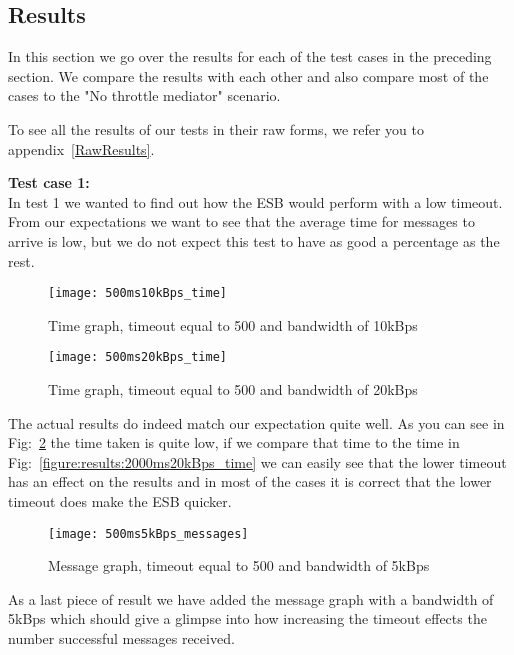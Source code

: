 \subsection{Results}\label{Testing:Results}
	In this section we go over the results for each of the test cases in the preceding section. We compare the results with each other and also compare most of the cases to the "No throttle mediator" scenario.
	
	\begin{shaded}
	To see all the results of our tests in their raw forms, we refer you to \mbox{appendix~\ref{RawResults}}.
	\end{shaded}
	 
    \textbf{Test case 1:}\\
    In test 1 we wanted to find out how the ESB would perform with a low timeout. From our expectations we want to see that the average time for messages to arrive is low, but we do not expect this test to have as good a percentage as the rest. 
    
	\begin{figure}[H]
		\centering
		\texttt{[image: 500ms10kBps\_time]}
		\caption{Time graph, timeout equal to 500 and bandwidth of 10kBps} 
		\label{figure:results:500ms10kBps_time}
	\end{figure}
	
	\begin{figure}[H]
		\centering
		\texttt{[image: 500ms20kBps\_time]}
		\caption{Time graph, timeout equal to 500 and bandwidth of 20kBps} 
		\label{figure:results:500ms20kBps_time}
	\end{figure}
    
    The actual results do indeed match our expectation quite well. As you can see in Fig:~\ref{figure:results:500ms20kBps_time} the time taken is quite low, if we compare that time to the time in Fig:~\ref{figure:results:2000ms20kBps_time} we can easily see that the lower timeout has an effect on the results and in most of the cases it is correct that the lower timeout does make the ESB quicker.
    
    \begin{figure}[H]
		\centering
		\texttt{[image: 500ms5kBps\_messages]}
		\caption{Message graph, timeout equal to 500 and bandwidth of 5kBps} 
		\label{figure:results:500ms5kBps_messages}
	\end{figure}
	
	As a last piece of result we have added the message graph with a bandwidth of 5kBps which should give a glimpse into how increasing the timeout effects the number successful messages received.
    
